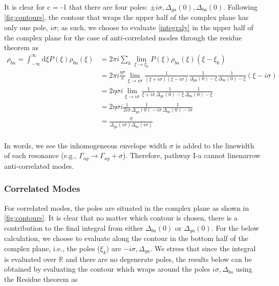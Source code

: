 \documentclass[aip, jcp, reprint, twocolumn]{revtex4-2}
\begin{document}
\begin{widetext}
It is clear for c = -1 that there are four poles: $\pm i \sigma, \Delta_{ga}(0), \Delta_{ba}(0)$. 
Following \autoref{fig:contours}, the contour that wraps the upper half of the complex plane has only one pole, $i \sigma$; as such, we choose to evaluate \autoref{integraly} in the upper half of the complex plane for the case of anti-correlated modes through the residue theorem as
	\begin{equation}
		\begin{split}
			\rho_{ba} = \int_{-\infty}^\infty \mathrm{d}\xi P(\xi) \rho_{ba}(\xi) &= 2\pi i \sum_k \lim_{\xi \rightarrow \xi_k} P(\xi) \rho_{ba}(\xi) (\xi - \xi_k)\\
			&= 2\pi i \frac{\eta \sigma}{\pi} \lim_{\xi \rightarrow i\sigma} \frac{1}{(\xi + i\sigma)(\xi - i\sigma)} \frac{1}{\Delta_{ga}(0) - \xi} \frac{1}{\Delta_{ba}(0) - \xi} (\xi - i \sigma)\\
			&= 2 \eta \sigma i \lim_{\xi \rightarrow i\sigma} \frac{1}{\xi + i\sigma} \frac{1}{\Delta_{ga}(0) - \xi} \frac{1}{\Delta_{ba}(0) - \xi}\\
			&= 2\eta \sigma i \frac{1}{2i\sigma} \frac{1}{\Delta_{ga}(0) - i\sigma} \frac{1}{\Delta_{ba}(0) - i\sigma}\\
			&= \frac{\eta}{\Delta_{ga}(i\sigma)\Delta_{ba}(i \sigma)}\\
		\end{split}
	\end{equation}


In words, we see the inhomogeneous envelope width $\sigma$ is added to the linewidth of each resonance (e.g., $\Gamma_{ag} \rightarrow \Gamma_{ag} + \sigma$).
Therefore, pathway I-a cannot linenarrow anti-correlated modes. 
\subsubsection{Correlated Modes}
For correlated modes, the poles are situated in the complex plane as shown in \autoref{fig:contours}.
It is clear that no matter which contour is chosen, there is a contribution to the final integral from either $\Delta_{ba}(0)$ or $\Delta_{ga}(0)$. 
For the below calculation, we choose to evaluate along the contour in the bottom half of the complex plane, i.e., the poles ($\xi_k$) are $-i\sigma, \Delta_{ga}$.
We stress that since the integral is evaluated over $\mathbb{R}$ and there are no degenerate poles, the results below can be obtained by evaluating the contour which wraps around the poles $i\sigma, \Delta_{ba}$ using the Residue theorem as 


\end{widetext}
\end{document}
